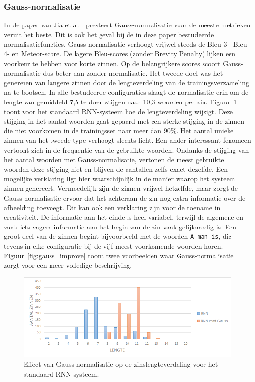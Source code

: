 \subsubsection{Gauss-normalisatie}
In de paper van Jia et al.~\cite{Fernando2015} presteert Gauss-normalisatie voor de meeste metrieken veruit het beste. 
Dit is ook het geval bij de in deze paper bestudeerde normalisatiefuncties. Gauss-normalisatie verhoogt vrijwel steeds de Bleu-3-, Bleu-4- en Meteor-score. De lagere Bleu-scores (zonder Brevity Penalty) lijken een voorkeur te hebben voor korte zinnen. Op de belangrijkere scores scoort Gauss-normalisatie dus beter dan zonder normalisatie. 
Het tweede doel was het genereren van langere zinnen door de lengteverdeling van de trainingsverzameling na te bootsen.
In alle bestudeerde configuraties slaagt de normalisatie erin om de lengte van gemiddeld 7,5 te doen stijgen naar 10,3 woorden per zin. Figuur~\ref{fig:gauss} toont voor het standaard RNN-systeem hoe de lengteverdeling wijzigt. Deze stijging in het aantal woorden gaat gepaard met een sterke stijging in de zinnen die niet voorkomen in de trainingsset naar meer dan 90\%. Het aantal unieke zinnen van het tweede type verhoogt slechts licht. 
Een ander interessant fenomeen vertoont zich in de frequentie van de gebruikte woorden. Ondanks de stijging van het aantal woorden met Gauss-normalisatie, vertonen de meest gebruikte woorden deze stijging niet en blijven de aantallen zelfs exact dezelfde. Een mogelijke verklaring ligt hier waarschijnlijk in de manier waarop het systeem zinnen genereert. Vermoedelijk zijn de zinnen vrijwel hetzelfde, maar zorgt de Gauss-normalisatie ervoor dat het achteraan de zin nog extra informatie over de afbeelding toevoegt. Dit kan ook een verklaring zijn voor de toename in creativiteit. De informatie aan het einde is heel variabel, terwijl de algemene en vaak iets vagere informatie aan het begin van de zin vaak gelijkaardig is. Een groot deel van de zinnen begint bijvoorbeeld met de woorden \texttt{A man is}, die tevens in elke configuratie bij de vijf meest voorkomende woorden horen. Figuur~\ref{fig:gauss_improve} toont twee voorbeelden waar Gauss-normalisatie zorgt voor een meer volledige beschrijving.

\begin{figure}[tb]
	\centering
	\includegraphics[width=\textwidth]{Images/gauss_length.PNG}
	\caption[Effect van gauss-normalisatie op de zinslengteverdeling]{Effect van Gauss-normalisatie op de zinslengteverdeling voor het standaard RNN-systeem.}
	\label{fig:gauss}
\end{figure}  

